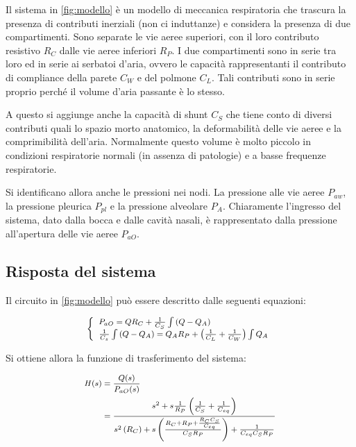 Il sistema in \cref{fig:modello} è un modello di meccanica respiratoria che trascura la presenza di contributi inerziali (non ci induttanze) e considera la presenza di due compartimenti. Sono separate le vie aeree superiori, con il loro contributo resistivo $R_C$ dalle vie aeree inferiori $R_P$. I due compartimenti sono in serie tra loro ed in serie ai serbatoi d'aria, ovvero le capacità rappresentanti il contributo di compliance della parete $C_W$ e del polmone $C_L$. 
Tali contributi sono in serie proprio perché il volume d'aria passante è lo stesso. 

A questo si aggiunge anche la capacità di shunt $C_S$ che tiene conto di diversi contributi quali lo spazio morto anatomico, la deformabilità delle vie aeree e la comprimibilità dell'aria. Normalmente questo volume è molto piccolo in condizioni respiratorie normali (in assenza di patologie) e a basse frequenze respiratorie.

Si identificano allora anche le pressioni nei nodi. La pressione alle vie aeree $P_{aw}$, la pressione pleurica $P_{pl}$ e la pressione alveolare $P_A$. Chiaramente l'ingresso del sistema, dato dalla bocca e dalle cavità nasali, è rappresentato dalla pressione all'apertura delle vie aeree $P_{aO}$. 



\subsection{Risposta del sistema}

Il circuito in \cref{fig:modello} può essere descritto dalle seguenti equazioni:

\begin{equation}
	\footnotesize{
	\left\{\begin{array}{l}
		P_{a O}=Q R_{C}+\frac{1}{C_{S}} \int\left(Q-Q_{A}\right) \\
		\frac{1}{C_{s}} \int\left(Q-Q_{A}\right)=Q_{A} R_{P}+\left(\frac{1}{C_{L}}+\frac{1}{C_{W}}\right) \int Q_{A}
	\end{array}\right.}
\label{eq:modello}
\end{equation}

Si ottiene allora la funzione di trasferimento del sistema:

\begin{equation}
		\footnotesize{
\begin{aligned}
	H(s)&=\frac{Q(s)}{P_{a O}(s)}\\
	&=\frac{s^{2}+s \frac{1}{R_{P}}\left(\frac{1}{C_{S}}+\frac{1}{C_{e q}}\right)}{s^{2}\left(R_{C}\right)+s\left(\frac{R_{C}+R_{P}+\frac{R_{C} C_{S}}{C_{e q}}}{C_{S} R_{P}}\right)+\frac{1}{C_{e q} C_{S} R_{P}}}
\end{aligned}}
\label{eq:fdt}
\end{equation}

